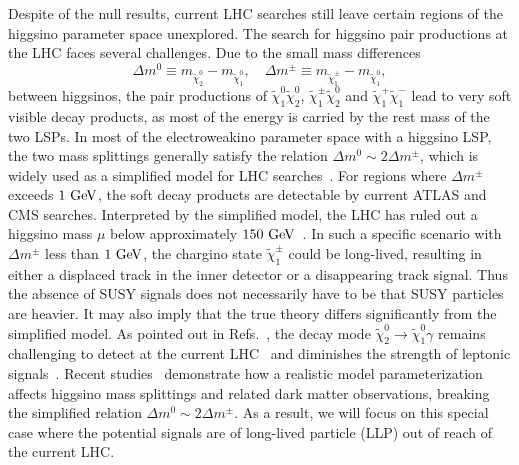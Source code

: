 \documentclass[letterpaper,11pt]{article}
\def\to{\rightarrow}
\begin{document}
Despite of the null results, current LHC searches still leave certain regions of the higgsino parameter space unexplored. The search for higgsino pair productions at the LHC faces several challenges. Due to the small mass differences 
\begin{equation}
\Delta m^0 \equiv m_{\tilde{\chi}_2^0} - m_{\tilde{\chi}_1^0}, \quad
\Delta m^\pm \equiv m_{\tilde{\chi}_1^\pm} - m_{\tilde{\chi}_1^0}, 
\end{equation}
between higgsinos, the pair productions of $\tilde{\chi}_1^0 \tilde{\chi}_2^0$, $\tilde{\chi}_1^\pm \tilde{\chi}_2^0$ and $\tilde{\chi}_1^+ \tilde{\chi}_1^-$ lead to very soft visible decay products, as most of the energy is carried by the rest mass of the two LSPs. In most of the electroweakino parameter space with a higgsino LSP, the two mass splittings generally satisfy the relation $\Delta m^0 \sim 2 \Delta m^\pm$, which is widely used as a simplified model for LHC searches~\cite{LHCNewPhysicsWorkingGroup:2011mji, Canepa:2020ntc}. For regions where $\Delta m^\pm$ exceeds $1~{\rm GeV}$, the soft decay products are detectable by current ATLAS and CMS searches. Interpreted by the simplified model, the LHC has ruled out a higgsino mass $\mu$ below approximately $150~{\rm GeV}$~\cite{Abdallah:2002aik, DELPHI:1999jsl, ALEPH:2002gap, L3:1999twz, DELPHI:1997tcq, ATLAS:2021moa, ATLAS:2019lng, CMS:2021edw, ATLAS:2021kxv, Buanes:2022wgm, CMS:2021far, Agin:2023yoq, CMS-PAS-EXO-23-017, ATLAS:2024umc, CMS:2025twk, ATLAS:2022rme, CMS:2023mny, ATLAS:2024woy}.
In such a specific scenario with $\Delta m^\pm$ less than $1~{\rm GeV}$, the chargino state $\tilde{\chi}_1^\pm$ could be long-lived, resulting in either a displaced track in the inner detector or a disappearing track signal.
% 
Thus the absence of SUSY signals does not necessarily have to be that SUSY particles are heavier. It may also imply that the true theory differs significantly from the simplified model. As pointed out in Refs.~\cite{Baum:2023inl, Chakraborti:2024pdn}, the decay mode $\tilde{\chi}_2^0 \to \tilde{\chi}_1^0 \gamma$ remains challenging to detect at the current LHC~\cite{ATLAS:2024woy} and diminishes the strength of leptonic signals~\cite{Constantin:2025mex}. Recent studies~\cite{Martin:2024pxx, Martin:2024ytt} demonstrate how a realistic model parameterization affects higgsino mass splittings and related dark matter observations, breaking the simplified relation $\Delta m^0 \sim 2 \Delta m^\pm$. As a result, we will focus on this special case where the potential signals are of long-lived particle (LLP) out of reach of the current LHC. 
\end{document}
